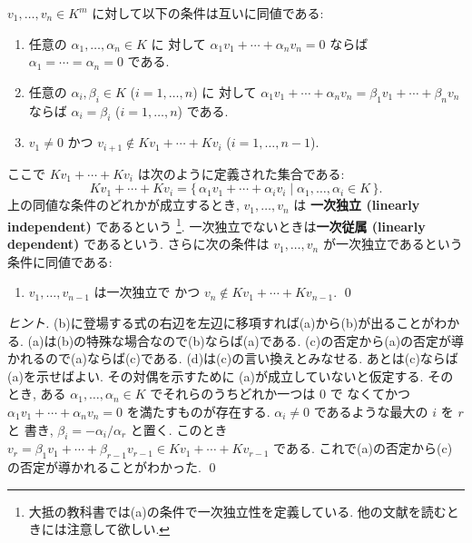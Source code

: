 \documentclass[12pt,twoside]{jarticle}
\begin{document}
\begin{question}[一次独立性]
  \label{q:lin-indep}
  $v_1,\ldots,v_n\in K^m$ に対して以下の条件は互いに同値である:
  \begin{enumerate}
  \item[(a)] 任意の $\alpha_1,\ldots,\alpha_n\in K$ に
    対して $\alpha_1v_1+\cdots+\alpha_nv_n=0$ 
    ならば $\alpha_1=\cdots=\alpha_n=0$ である.
  \item[(b)] 任意の $\alpha_i,\beta_i\in K$ ($i=1,\ldots,n$) に
    対して $\alpha_1v_1+\cdots+\alpha_nv_n=\beta_1v_1+\cdots+\beta_nv_n$ 
    ならば $\alpha_i=\beta_i$ ($i=1,\ldots,n$) である.
  \item[(c)] $v_1\ne 0$ かつ $v_{i+1}\not\in K v_1+\cdots+K v_i$ 
    ($i=1,\ldots,n-1$).
  \end{enumerate}
  ここで $K v_1+\cdots+K v_i$ は次のように定義された集合である:
  \begin{equation*}
    K v_1+\cdots+K v_i =
    \{\, \alpha_1v_1+\cdots+\alpha_iv_i 
    \mid \alpha_1,\ldots,\alpha_i\in K \,\}.
  \end{equation*}
  上の同値な条件のどれかが成立するとき, $v_1,\ldots,v_n$ は
  {\bf 一次独立 (linearly independent)} であるという%
  \footnote{大抵の教科書では(a)の条件で一次独立性を定義している.
    他の文献を読むときには注意して欲しい.}. 
  一次独立でないときは{\bf 一次従属 (linearly dependent)} であるという. 
  さらに次の条件は $v_1,\ldots,v_n$ が一次独立であるという条件に同値である:
  \begin{enumerate}
  \item[(d)] $v_1,\ldots,v_{n-1}$ は一次独立で
    かつ $v_n\not\in Kv_1+\cdots+Kv_{n-1}$.
    \qed
  \end{enumerate}
\end{question}

\begin{proof}[ヒント]
  (b)に登場する式の右辺を左辺に移項すれば(a)から(b)が出ることがわかる.
  (a)は(b)の特殊な場合なので(b)ならば(a)である.
  (c)の否定から(a)の否定が導かれるので(a)ならば(c)である.
  (d)は(c)の言い換えとみなせる.
  あとは(c)ならば(a)を示せばよい. その対偶を示すために
  (a)が成立していないと仮定する. そのとき, 
  ある $\alpha_1,\ldots,\alpha_n\in K$ でそれらのうちどれか一つは $0$ で
  なくてかつ $\alpha_1v_1+\cdots+\alpha_nv_n=0$ を満たすものが存在する.
  $\alpha_i\ne 0$ であるような最大の $i$ を $r$ と
  書き, $\beta_i=-\alpha_i/\alpha_r$ と置く.
  このとき $v_r = \beta_1v_1+\cdots+\beta_{r-1}v_{r-1}
  \in Kv_1+\cdots+Kv_{r-1}$ である. 
  これで(a)の否定から(c)の否定が導かれることがわかった.
  \qed
\end{proof}
\end{document}
